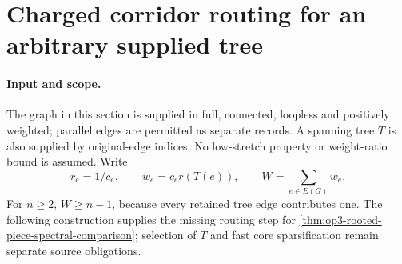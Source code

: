 \section[Weighted corridor routing]{Charged corridor routing for an arbitrary supplied tree}
\label{sec:op3-weighted-corridor-routing}

\paragraph{Input and scope.}
The graph in this section is supplied in full, connected, loopless and
positively weighted; parallel edges are permitted as separate records.
A spanning tree $T$ is also supplied by original-edge indices. No
low-stretch property or weight-ratio bound is assumed. Write
\[
 r_e=1/c_e,\qquad w_e=c_e r(T(e)),\qquad W=\sum_{e\in E(G)}w_e.
\]
For $n\geq2$, $W\geq n-1$, because every retained tree edge contributes
one. The following construction supplies the missing routing step for
\cref{thm:op3-rooted-piece-spectral-comparison}; selection of $T$ and
fast core sparsification remain separate source obligations.

